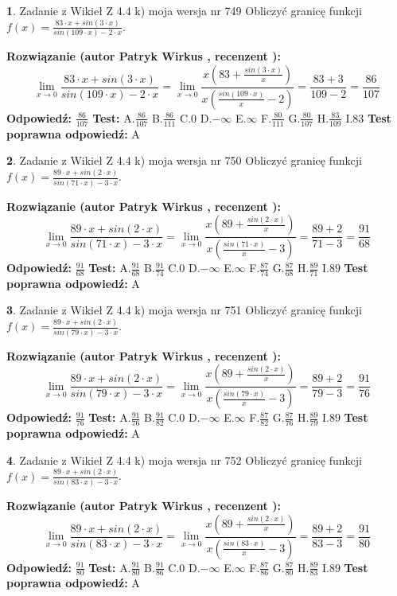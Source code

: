 \documentclass[12pt, a4paper]{article}
\theoremstyle{definition} %
\newtheorem{zad}{}
\newcommand{\zadStart}[1]{\begin{zad}#1\newline}
\newcommand{\zadStop}{\end{zad}}
\newcommand{\rozwStart}[2]{\noindent \textbf{Rozwiązanie (autor #1 , recenzent #2): }\newline}
\newcommand{\rozwStop}{\newline}
\newcommand{\odpStart}{\noindent \textbf{Odpowiedź:}\newline}
\newcommand{\odpStop}{\newline}
\newcommand{\testStart}{\noindent \textbf{Test:}\newline}
\newcommand{\testStop}{\newline}
\newcommand{\kluczStart}{\noindent \textbf{Test poprawna odpowiedź:}\newline}
\newcommand{\kluczStop}{\newline}
\begin{document}
\zadStart{Zadanie z Wikieł Z 4.4 k) moja wersja nr 749}
Obliczyć granicę funkcji $f(x)=\frac{83\cdot x +sin(3\cdot x)}{sin(109\cdot x) -2\cdot x}$.
\zadStop
\rozwStart{Patryk Wirkus}{}
$$\lim\limits_{x\to 0}\frac{83\cdot x +sin(3\cdot x)}{sin(109\cdot x) -2\cdot x}
=\lim\limits_{x\to 0}\frac{x(83+\frac{sin(3\cdot x)}{x})}{x(\frac{sin(109\cdot x)}{x}-2)}
=\frac{83+3}{109-2} = \frac{86}{107}$$
\rozwStop
\odpStart
$\frac{86}{107}$
\odpStop
\testStart
A.$\frac{86}{107}$
B.$\frac{86}{111}$
C.$0$
D.$-\infty$
E.$\infty$
F.$\frac{80}{111}$
G.$\frac{80}{107}$
H.$\frac{83}{109}$
I.$83$
\testStop
\kluczStart
A
\kluczStop



\zadStart{Zadanie z Wikieł Z 4.4 k) moja wersja nr 750}
Obliczyć granicę funkcji $f(x)=\frac{89\cdot x +sin(2\cdot x)}{sin(71\cdot x) -3\cdot x}$.
\zadStop
\rozwStart{Patryk Wirkus}{}
$$\lim\limits_{x\to 0}\frac{89\cdot x +sin(2\cdot x)}{sin(71\cdot x) -3\cdot x}
=\lim\limits_{x\to 0}\frac{x(89+\frac{sin(2\cdot x)}{x})}{x(\frac{sin(71\cdot x)}{x}-3)}
=\frac{89+2}{71-3} = \frac{91}{68}$$
\rozwStop
\odpStart
$\frac{91}{68}$
\odpStop
\testStart
A.$\frac{91}{68}$
B.$\frac{91}{74}$
C.$0$
D.$-\infty$
E.$\infty$
F.$\frac{87}{74}$
G.$\frac{87}{68}$
H.$\frac{89}{71}$
I.$89$
\testStop
\kluczStart
A
\kluczStop



\zadStart{Zadanie z Wikieł Z 4.4 k) moja wersja nr 751}
Obliczyć granicę funkcji $f(x)=\frac{89\cdot x +sin(2\cdot x)}{sin(79\cdot x) -3\cdot x}$.
\zadStop
\rozwStart{Patryk Wirkus}{}
$$\lim\limits_{x\to 0}\frac{89\cdot x +sin(2\cdot x)}{sin(79\cdot x) -3\cdot x}
=\lim\limits_{x\to 0}\frac{x(89+\frac{sin(2\cdot x)}{x})}{x(\frac{sin(79\cdot x)}{x}-3)}
=\frac{89+2}{79-3} = \frac{91}{76}$$
\rozwStop
\odpStart
$\frac{91}{76}$
\odpStop
\testStart
A.$\frac{91}{76}$
B.$\frac{91}{82}$
C.$0$
D.$-\infty$
E.$\infty$
F.$\frac{87}{82}$
G.$\frac{87}{76}$
H.$\frac{89}{79}$
I.$89$
\testStop
\kluczStart
A
\kluczStop



\zadStart{Zadanie z Wikieł Z 4.4 k) moja wersja nr 752}
Obliczyć granicę funkcji $f(x)=\frac{89\cdot x +sin(2\cdot x)}{sin(83\cdot x) -3\cdot x}$.
\zadStop
\rozwStart{Patryk Wirkus}{}
$$\lim\limits_{x\to 0}\frac{89\cdot x +sin(2\cdot x)}{sin(83\cdot x) -3\cdot x}
=\lim\limits_{x\to 0}\frac{x(89+\frac{sin(2\cdot x)}{x})}{x(\frac{sin(83\cdot x)}{x}-3)}
=\frac{89+2}{83-3} = \frac{91}{80}$$
\rozwStop
\odpStart
$\frac{91}{80}$
\odpStop
\testStart
A.$\frac{91}{80}$
B.$\frac{91}{86}$
C.$0$
D.$-\infty$
E.$\infty$
F.$\frac{87}{86}$
G.$\frac{87}{80}$
H.$\frac{89}{83}$
I.$89$
\testStop
\kluczStart
A
\kluczStop
\end{document}
